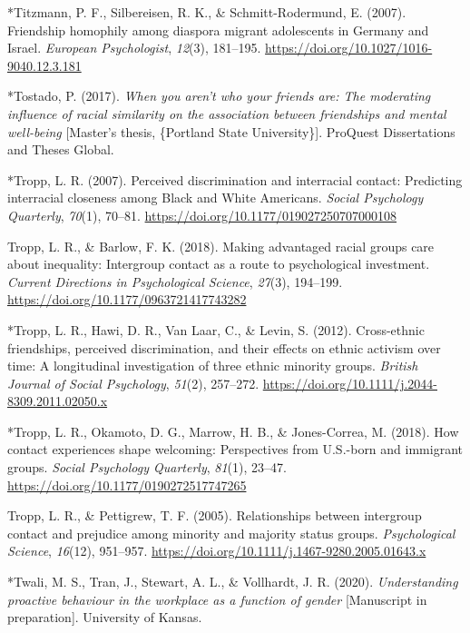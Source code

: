 \documentclass[12pt, letterpaper]{article}
\newenvironment{CSLReferences}[2]{}{}
\begin{document}
\begin{CSLReferences}{1}{0}
\leavevmode\hypertarget{ref-1966}{}%
*Titzmann, P. F., Silbereisen, R. K., \& Schmitt-Rodermund, E. (2007).
Friendship homophily among diaspora migrant adolescents in {Germany} and
{Israel}. \emph{European Psychologist}, \emph{12}(3), 181--195.
\url{https://doi.org/10.1027/1016-9040.12.3.181}

\leavevmode\hypertarget{ref-1221}{}%
*Tostado, P. (2017). \emph{When you aren't who your friends are: {The}
moderating influence of racial similarity on the association between
friendships and mental well-being} {[}Master's thesis, \{Portland State
University\}{]}. {ProQuest Dissertations and Theses Global}.

\leavevmode\hypertarget{ref-933}{}%
*Tropp, L. R. (2007). Perceived discrimination and interracial contact:
{Predicting} interracial closeness among {Black} and {White}
{Americans}. \emph{Social Psychology Quarterly}, \emph{70}(1), 70--81.
\url{https://doi.org/10.1177/019027250707000108}

\leavevmode\hypertarget{ref-tropp_making_2018}{}%
Tropp, L. R., \& Barlow, F. K. (2018). Making advantaged racial groups
care about inequality: Intergroup contact as a route to psychological
investment. \emph{Current Directions in Psychological Science},
\emph{27}(3), 194--199. \url{https://doi.org/10.1177/0963721417743282}

\leavevmode\hypertarget{ref-1743}{}%
*Tropp, L. R., Hawi, D. R., Van Laar, C., \& Levin, S. (2012).
Cross-ethnic friendships, perceived discrimination, and their effects on
ethnic activism over time: {A} longitudinal investigation of three
ethnic minority groups. \emph{British Journal of Social Psychology},
\emph{51}(2), 257--272.
\url{https://doi.org/10.1111/j.2044-8309.2011.02050.x}

\leavevmode\hypertarget{ref-1658}{}%
*Tropp, L. R., Okamoto, D. G., Marrow, H. B., \& Jones-Correa, M.
(2018). How contact experiences shape welcoming: Perspectives from
{U}.{S}.-born and immigrant groups. \emph{Social Psychology Quarterly},
\emph{81}(1), 23--47. \url{https://doi.org/10.1177/0190272517747265}

\leavevmode\hypertarget{ref-tropp_relationships_2005}{}%
Tropp, L. R., \& Pettigrew, T. F. (2005). Relationships between
intergroup contact and prejudice among minority and majority status
groups. \emph{Psychological Science}, \emph{16}(12), 951--957.
\url{https://doi.org/10.1111/j.1467-9280.2005.01643.x}

\leavevmode\hypertarget{ref-2394}{}%
*Twali, M. S., Tran, J., Stewart, A. L., \& Vollhardt, J. R. (2020).
\emph{Understanding proactive behaviour in the workplace as a function
of gender} {[}Manuscript in preparation{]}. University of Kansas.


\end{CSLReferences}
\end{document}
